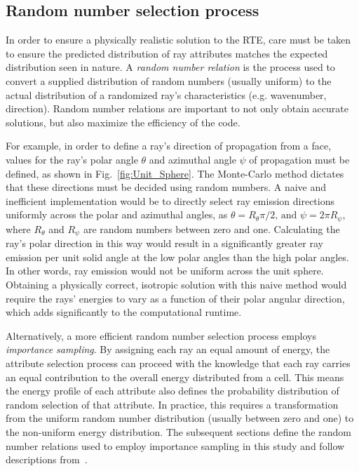 \subsection{Random number selection process}  \label{section:randomnumberrelations}
In order to ensure a physically realistic solution to the RTE, care must be taken to ensure the predicted distribution of ray attributes matches the expected distribution seen in nature. A \textit{random number relation} is the process used to convert a supplied distribution of random numbers (usually uniform) to the actual distribution of a randomized ray's characteristics (e.g. wavenumber, direction).
Random number relations are important to not only obtain accurate solutions, but also maximize the efficiency of the code.

For example, in order to define a ray's direction of propagation from a face, values for the ray's polar angle $\theta{}$ and azimuthal angle $\psi{}$ of propagation must be defined, as shown in Fig.~\ref{fig:Unit_Sphere}. The Monte-Carlo method dictates that these directions must be decided using random numbers.
A naive and inefficient implementation would be to directly select ray emission directions uniformly across the polar and azimuthal angles, as $\theta{}=R_\theta{}\pi{}/2 \text{, and }\psi{} = 2\pi{}R_\psi{} ,$
where $R_\theta$ and $R_\psi{}$ are random numbers between zero and one. 
Calculating the ray's polar direction in this way would result in a significantly greater ray emission per unit solid angle at the low polar angles than the high polar angles. In other words, ray emission would not be uniform across the unit sphere. Obtaining a physically correct, isotropic solution with this naive method would require the rays' energies to vary as a function of their polar angular direction, which adds significantly to the computational runtime.

Alternatively, a more efficient random number selection process employs \textit{importance sampling}.
By assigning each ray an equal amount of energy, the attribute selection process can proceed with the knowledge that each ray carries an equal contribution to the overall energy distributed from a cell.
This means the energy profile of each attribute also defines the probability distribution of random selection of that attribute. In practice, this requires a transformation from the uniform random number distribution (usually between zero and one) to the non-uniform energy distribution.
The subsequent sections define the random number relations used to employ importance sampling in this study and follow descriptions from~\citet{Modest2022ChapterMediac}.

